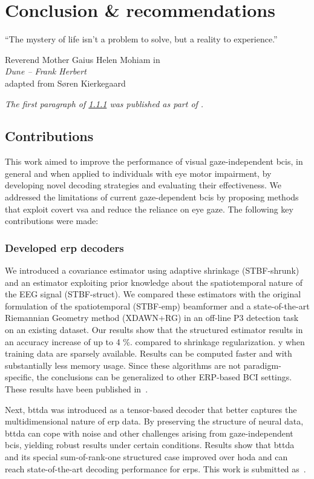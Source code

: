 \chapter{Conclusion \& recommendations}
\epigraph{``The mystery of life isn't a problem to solve, but a reality to
experience.''}{ Reverend Mother Gaius Helen Mohiam in \\ \emph{Dune -- Frank
Herbert}\\ adapted from S{\o}ren Kierkegaard}
\noindent\emph{The first paragraph of \cref{sec:conclusion/contrib/decoders} was published as
part of \textcite{VanDenKerchove2022}.}


\section{Contributions}

This work aimed to improve the performance of visual gaze-independent \acsp{bci}, in general
and when applied to individuals with eye motor impairment, by developing novel decoding
strategies and evaluating their effectiveness.
We addressed the limitations of current gaze-dependent \acp{bci} by proposing methods that
exploit covert \ac{vsa} and reduce the reliance on eye gaze.
The following key contributions were made:

\subsection{Developed \acs{erp} decoders}
\label{sec:conclusion/contrib/decoders}
We introduced a covariance estimator using adaptive shrinkage (STBF-shrunk) and an estimator
exploiting prior knowledge about the spatiotemporal nature of the EEG signal
(STBF-struct).
We compared these estimators with the original formulation of the
spatiotemporal (STBF-emp)
beamformer and a state-of-the-art Riemannian Geometry method (XDAWN+RG) in an off-line P3 detection task on
an existing dataset.
Our results show that the structured estimator results in an accuracy
increase of up to 4 \%. compared to shrinkage regularization.
y when training data are sparsely available.
Results can be computed faster and with
substantially less memory usage.
Since these algorithms are not paradigm-specific, the conclusions can be
generalized to other ERP-based BCI settings.
These results have been published in~\textcite{VanDenKerchove2022}.

Next, \acf{bttda} was introduced as a tensor-based decoder that better captures the
multidimensional nature of \ac{erp} data.
By preserving the structure of neural data, \ac{bttda} can cope with noise and other challenges
arising from gaze-independent \acp{bci}, yielding robust results under certain conditions.
Results show that \ac{bttda} and its special sum-of-rank-one structured case
improved over \ac{hoda} and can reach state-of-the-art decoding performance for
\acp{erp}.
This work is submitted as~\textcite{VanDenKerchove2024a}.

